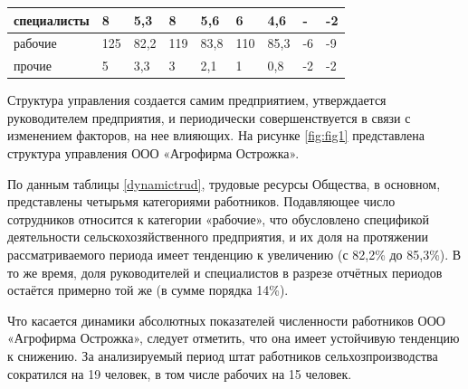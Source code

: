 \begin{table}[!ht]
\begin{tabularx}{\textwidth}{|p{3.85cm}|K{1cm}|K{1cm}|K{1cm}|K{1cm}|K{1cm}|K{1cm}|K{1.6cm}|K{1.6cm}|}
		специалисты                            & 8                         & 5,3                     & 8                         & 5,6                     & 6                         & 4,6                     & -                                      & -2                                     \\ \hline
		рабочие                                & 125                       & 82,2                    & 119                       & 83,8                    & 110                       & 85,3                    & -6                                     & -9                                     \\ \hline
		прочие                                 & 5                         & 3,3                     & 3                         & 2,1                     & 1                         & 0,8                     & -2                                     & -2                                     \\ \hline
	\end{tabularx}
\end{table}

Структура управления создается самим предприятием, утверждается руководителем предприятия, и периодически совершенствуется в связи с изменением факторов, на нее влияющих.
На рисунке \ref{fig:fig1} представлена структура управления ООО «Агрофирма Острожка».





По данным таблицы \ref{dynamictrud}, трудовые ресурсы Общества, в основном, представлены четырьмя категориями работников. Подавляющее число сотрудников относится к категории «рабочие», что обусловлено спецификой деятельности сельскохозяйственного предприятия, и их доля на протяжении рассматриваемого периода имеет тенденцию к увеличению (с 82,2\% до 85,3\%). В то же время, доля руководителей и специалистов в разрезе отчётных периодов остаётся примерно той же (в сумме порядка 14\%).

Что касается динамики абсолютных показателей численности работников ООО «Агрофирма Острожка», следует отметить, что она имеет устойчивую тенденцию к снижению. За анализируемый период штат работников сельхозпроизводства сократился на 19 человек, в том числе  рабочих на 15 человек.









